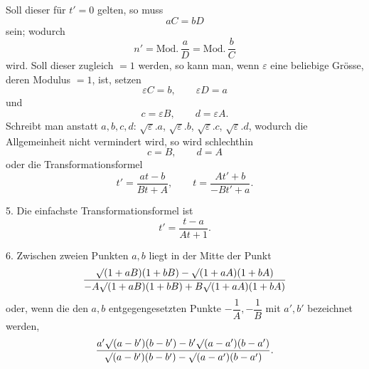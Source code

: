 \noindent Soll dieser für $t'=0$ gelten, so muss
\[
aC=bD
\]
sein; wodurch
\[
n'=\text{Mod.}\,\frac{a}{D}=\text{Mod.}\,\frac{b}{C}
\]
wird. Soll dieser zugleich $=1$ werden, so kann man, wenn $\varepsilon$ eine beliebige
Grösse, deren Modulus $=1$, ist, setzen
\[
\varepsilon{}C=b,\qquad \varepsilon{}D=a
\]
und
\[
c=\varepsilon{}B,\qquad d=\varepsilon{}A.
\]
Schreibt man anstatt $a,b,c,d$: $\sqrt{\varepsilon}.a$,
$\sqrt{\varepsilon}.b$, $\sqrt{\varepsilon}.c$, $\sqrt{\varepsilon}.d$,
wodurch die Allgemeinheit nicht vermindert wird, so wird schlechthin
\[
c=B,\qquad d=A
\]
oder die Transformationsformel
\[
t'=\frac{at-b}{Bt+A},\qquad
t=\frac{At'+b}{-Bt'+a}.
\]

5. Die einfachste Transformationsformel ist
\[
t'=\frac{t-a}{At+1}.
\]

6. Zwischen zweien Punkten $a,b$ liegt in der Mitte der Punkt
\[
\frac{\mathord{\surd}(1+aB)(1+bB)-\mathord{\surd}(1+aA)(1+bA)}
{-A\mathord{\surd}(1+aB)(1+bB)+B\mathord{\surd}(1+aA)(1+bA)}
\]
oder, wenn die den $a,b$ entgegengesetzten Punkte $-\dfrac{1}{A},-\dfrac{1}{B}$
mit $a',b'$ bezeichnet werden,
\[
\frac{a'\mathord{\surd}(a-b')(b-b')-b'\mathord{\surd}(a-a')(b-a')}
{\mathord{\surd}(a-b')(b-b')-\mathord{\surd}(a-a')(b-a')}.
\]
